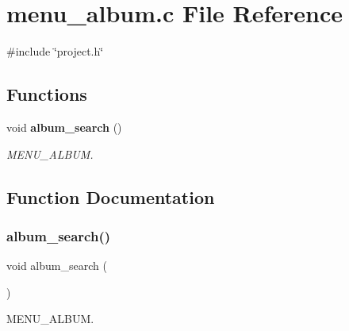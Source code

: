 \section{menu\+\_\+album.\+c File Reference}
\label{menu__album_8c}
{\ttfamily \#include \char`\"{}project.\+h\char`\"{}}\newline
\subsection*{Functions}
\begin{DoxyCompactItemize}
\item 
void \textbf{ album\+\_\+search} ()
\begin{DoxyCompactList}\small\item\em M\+E\+N\+U\+\_\+\+A\+L\+B\+UM. \end{DoxyCompactList}\end{DoxyCompactItemize}


\subsection{Function Documentation}
\mbox{\label{menu__album_8c_a8e05ef4493750f4348b12f44571a0cb4}} 
\subsubsection{album\_search()}
{\footnotesize\ttfamily void album\+\_\+search (\begin{DoxyParamCaption}{ }\end{DoxyParamCaption})}



M\+E\+N\+U\+\_\+\+A\+L\+B\+UM. 

